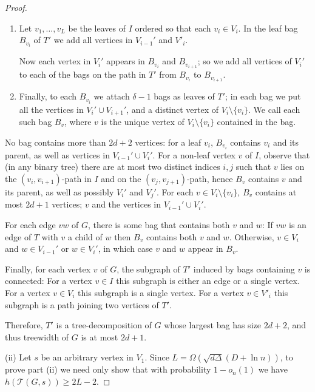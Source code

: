 \documentclass{patmorin}
\newcommand{\tcal}{\mathcal{T}}
\begin{document}
\begin{proof}
\begin{enumerate}
    \item Let $v_1,\ldots,v_L$ be the
     leaves of $I$ ordered so that each $v_i\in V_i$. In the leaf bag
     $B_{v_i}$ of $T'$ we add all vertices in
     $V_{i-1}'$ and $V'_{i}$.

     Now each vertex in $V_{i}'$ appears in $B_{v_i}$ and $B_{v_{i+1}}$;
     so we add all vertices of $V_i'$ to each of the bags on the path in $T'$ from $B_{v_i}$ 
     to $B_{v_{i+1}}$.

    \item  Finally, to each $B_{v_i}$ we attach $\delta-1$ bags as leaves
     of $T'$; in each bag we put all the vertices in $V_i' \cup V_{i+1}'$, and a distinct vertex of $V_i\setminus\{v_i\}$. We
     call each such bag $B_v$, where $v$ is the unique vertex of
     $V_i\setminus\{v_i\}$ contained in the bag.
  \end{enumerate}

  No bag contains more than $2d+2$ vertices: 
  for a leaf $v_i$,
  $B_{v_i}$ contains $v_i$ and its parent, as well as vertices in $V_{i-1}'\cup V_i'$.
  For a non-leaf vertex $v$ of $I$, observe that (in any binary tree)
  there are at most two distinct indices $i,j$ such that $v$ lies on the $(v_i,v_{i+1})$-path in $I$ and on
  the $(v_j,v_{j+1})$-path, hence $B_v$ contains $v$ and its parent, as well as possibly $V_i'$ and $V_j'$. For each $v\in V_i\setminus\{v_i\}$,
  $B_v$ contains at most $2d+1$ vertices; $v$ and the vertices in
  $V_{i-1}'\cup V_{i}'$.

  For each edge $vw$ of $G$, there is some bag that contains both $v$
  and $w$: If $vw$ is an edge of $T$ with $v$ a child of $w$ then $B_v$
  contains both $v$ and $w$. Otherwise, $v\in V_i$ and $w\in V_{i-1}'$
  or $w\in V_{i}'$, in which case $v$ and $w$ appear in $B_v$.

  Finally, for each vertex $v$ of $G$, the subgraph of $T'$ induced by
  bags containing $v$ is connected: For a vertex $v\in I$ this subgraph
  is either an edge or a single vertex.  For a vertex $v\in V_i$ this
  subgraph is a single vertex.  For a vertex $v\in V'_{i}$ this subgraph
  is a path joining two vertices of $T'$.

  Therefore, $T'$ is a tree-decomposition of $G$ whose largest bag
  has size $2d+2$, and thus treewidth of $G$ is at most $2d+1$.

(ii)
Let $s$ be an arbitrary vertex in $V_1$.
Since 
$L=\Omega(\sqrt{d\Delta}(D+\ln n))$,
to prove part (ii) we need only show that
with probability $1-o_n(1)$ we have 
 $h(\tcal(G,s)) \geq 2L-2$.


\end{proof}
\end{document}

